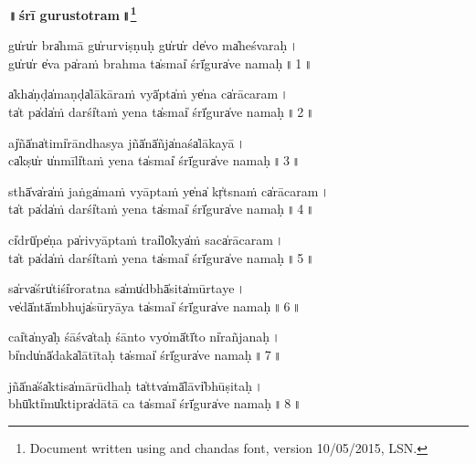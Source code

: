 \documentclass[parskip, DIV=14]{scrartcl}
\renewcommand{\thefootnote}{\fnsymbol{footnote}} %
\begin{document}

\vspace{-1.5cm}

\begin{center}
\textbf{{\Huge॥\,śrī gu॒rustotra॒m\,॥\LARGE\let\thefootnote\relax\footnote{\color{lightgray} Document written using \XeLaTeX{} and chandas font, version 10/05/2015, LSN.}}}
\end{center}
\Large

\centering	

\vspace{0.5cm}

gu̍ru̍r bra̍hmā gu̍rurvi॒ṣṇuḥ gu̍ru̍r de̍vo ma̍heśva॒ra॒ḥ\,। \\
gu̍ru̍r e̍va pa̍raṁ bra॒hma ta̍smai̍ śrī̍gura̍ve na॒ma॒ḥ॒\,॥\,1\,॥ \par 

a̍kha̍ṇḍa̍maṇḍa̍lākā॒raṁ vyā̍pta̍ṁ ye̍na ca̍rāca॒ra॒m\,। \\
ta̍t pa̍da̍ṁ darśi̍taṁ ye॒na  ta̍smai̍ śrī̍gura̍ve na॒ma॒ḥ॒\,॥\,2\,॥ \par 
 
aj̍ñā̍na̍timi̍rāndha॒sya jñā̍nā̍ñja̍naśa̍lāka॒yā॒\,। \\
ca̍kṣu̍r u̍nmīli̍taṁ ye॒na  ta̍smai̍ śrī̍gura̍ve na॒ma॒ḥ॒\,॥\,3\,॥ \par 

sthā̍va̍ra̍ṁ jaṅga̍maṁ vyā॒ptaṁ ye̍na̍ kṛ̍tsnaṁ ca̍rāca॒ra॒m\,। \\
ta̍t pa̍da̍ṁ darśi̍taṁ ye॒na  ta̍smai̍ śrī̍gura̍ve na॒ma॒ḥ॒\,॥\,4\,॥ \par 
 
ci̍drū̍pe̍ṇa pa̍rivyā॒ptaṁ trai̍lo̍kya̍ṁ saca̍rāca॒ra॒m\,। \\
ta̍t pa̍da̍ṁ darśi̍taṁ ye॒na  ta̍smai̍ śrī̍gura̍ve na॒ma॒ḥ॒\,॥\,5\,॥ \par 
 
sa̍rva̍śru̍tiśi̍rora॒tna sa̍mu̍dbhā̍sita̍mūrta॒ye॒\,। \\
ve̍dā̍ntā̍mbhuja̍sūryā॒ya  ta̍smai̍ śrī̍gura̍ve na॒ma॒ḥ॒\,॥\,6\,॥ \par 
 
cai̍ta̍nya̍ḥ śāśva̍taḥ śā॒nto vyo̍mā̍tī̍to ni̍rañja॒na॒ḥ\,। \\
bi̍ndu̍nā̍daka̍lātī॒taḥ  ta̍smai̍ śrī̍gura̍ve na॒ma॒ḥ॒\,॥\,7\,॥ \par 
 
jñā̍na̍śa̍ktisa̍mārū॒dhaḥ ta̍ttva̍mā̍lāvi̍bhūṣi॒ta॒ḥ\,। \\
bhū̍kti̍mu̍ktipra̍dātā॒ ca  ta̍smai̍ śrī̍gura̍ve na॒ma॒ḥ॒\,॥\,8\,॥ \par 
\end{document}
